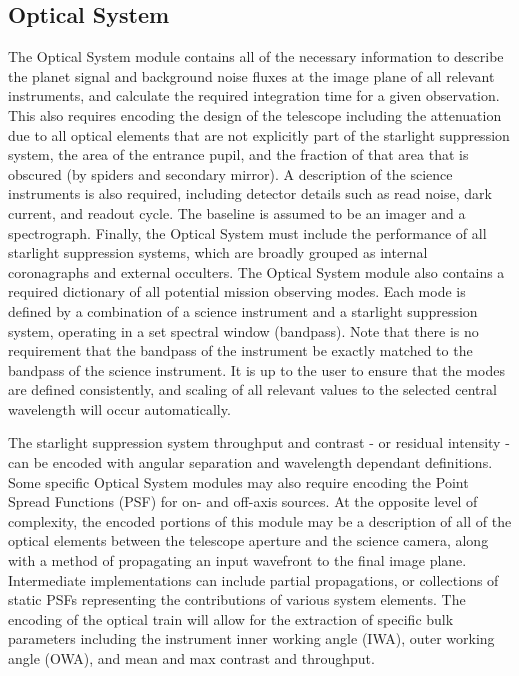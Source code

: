 \documentclass[cleanfoot]{asme2ej}
\begin{document}
\subsection{Optical System}
The Optical System module contains all of the necessary information to describe the planet signal and background noise fluxes at the image plane of all relevant instruments, and calculate the required integration time for a given observation.  This also requires encoding the design of the telescope including the attenuation due to all optical elements that are not explicitly part of the starlight suppression system, the area of the entrance pupil, and the fraction of that area that is obscured (by spiders and secondary mirror). A description of the science instruments is also required, including detector details such as read noise, dark current, and readout cycle. The baseline is assumed to be an imager and a spectrograph. Finally, the Optical System must include the performance of all starlight suppression systems, which are broadly grouped as internal coronagraphs and external occulters. The Optical System module also contains a required dictionary of all potential mission observing modes. Each mode is defined by a combination of a science instrument and a starlight suppression system, operating in a set spectral window (bandpass). Note that there is no requirement that the bandpass of the instrument be exactly matched to the bandpass of the science instrument.  It is up to the user to ensure that the modes are defined consistently, and scaling of all relevant values to the selected central wavelength will occur automatically.

The starlight suppression system throughput and contrast - or residual intensity - can be encoded with angular separation and wavelength dependant definitions. Some specific Optical System modules may also require encoding the Point Spread Functions (PSF) for on- and off-axis sources. At the opposite level of complexity, the encoded portions of this module may be a description of all of the optical elements between the telescope aperture and the science camera, along with a method of propagating an input wavefront to the final image plane.  Intermediate implementations can include partial propagations, or collections of static PSFs representing the contributions of various system elements.  The encoding of the optical train will allow for the extraction of specific bulk parameters including the instrument inner working angle (IWA), outer working angle (OWA), and mean and max contrast and throughput.
\end{document}
